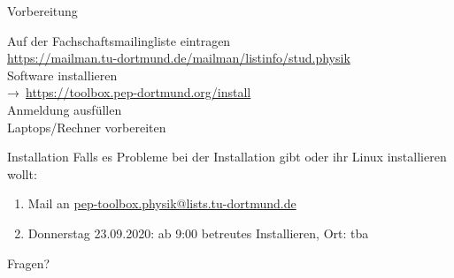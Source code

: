 \begin{frame}{Vorbereitung}
  \begin{center}
    \huge
    Auf der Fachschaftsmailingliste eintragen \\
    \url{https://mailman.tu-dortmund.de/mailman/listinfo/stud.physik}\\[0.5\baselineskip]
    Software installieren\\
    →~\textcolor{blue!70!black}{\url{https://toolbox.pep-dortmund.org/install}}\\[0.5\baselineskip]
    Anmeldung ausfüllen\\[0.5\baselineskip]
    Laptops/Rechner vorbereiten%
  \end{center}
\end{frame}
\begin{frame}{Installation}
  \huge
  Falls es Probleme bei der Installation gibt oder ihr Linux installieren wollt:\\[0.5\baselineskip]
  \begin{enumerate}
    \item Mail an \href{mailto:pep-toolbox.physik@lists.tu-dortmund.de}{pep-toolbox.physik@lists.tu-dortmund.de}
    \item Donnerstag 23.09.2020: ab 9:00 betreutes Installieren, Ort: tba
  \end{enumerate}
\end{frame}
\begin{frame}
  \Huge\centering
  \textcolor{red!70!black}{Fragen?}
\end{frame}

